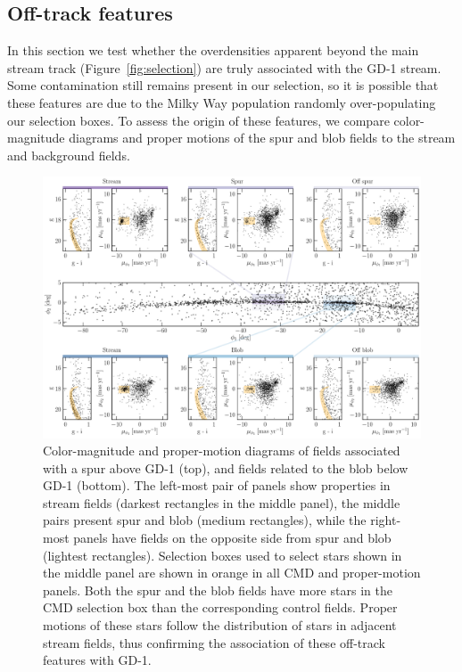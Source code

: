 \documentclass[modern]{aastex62}
\newcommand{\gaia}{\textsl{Gaia}}
\begin{document}
\subsection{Off-track features}
\label{sec:res_gap}
In this section we test whether the overdensities apparent beyond the main stream track (Figure~\ref{fig:selection}) are truly associated with the GD-1 stream.
Some contamination still remains present in our selection, so it is possible that these features are due to the Milky Way population randomly over-populating our selection boxes.
To assess the origin of these features, we compare color-magnitude diagrams and proper motions of the spur and blob fields to the stream and background fields.

\begin{figure}
\begin{center}
\includegraphics[width=\textwidth]{features.pdf}
\end{center}
\caption{
Color-magnitude and proper-motion diagrams of fields associated with a spur above GD-1 (top), and fields related to the blob below GD-1 (bottom).
The left-most pair of panels show properties in stream fields (darkest rectangles in the middle panel), the middle pairs present spur and blob (medium rectangles), while the right-most panels have fields on the opposite side from spur and blob (lightest rectangles).
Selection boxes used to select stars shown in the middle panel are shown in orange in all CMD and proper-motion panels.
Both the spur and the blob fields have more stars in the CMD selection box than the corresponding control fields.
Proper motions of these stars follow the distribution of stars in adjacent stream fields, thus confirming the association of these off-track features with GD-1.
}
\label{fig:features}
\end{figure}
\end{document}
